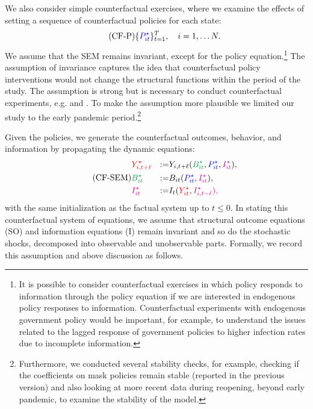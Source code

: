 \documentclass[3p, longtitle]{elsarticle}
\theoremstyle{definition}
\def\bcolor{\color{ForestGreen}}
\def\pcolor{\color{blue}}
\def\icolor{\color{magenta}}
\def\ycolor{\color{red}}
\begin{document}
We  also consider simple counterfactual exercises, where we examine the effects of setting
a sequence of counterfactual policies for each state:
\begin{equation} \label{p-cf}\tag{CF-P}
\{{\pcolor P^\star_{it}} \}_{t=1}^T, \quad i=1, \ldots N.
\end{equation}
We assume that the SEM remains invariant, except for the policy equation.\footnote{It is possible to consider counterfactual exercises in which policy  responds to information through the policy equation if we are interested in endogenous policy responses to information. Counterfactual experiments with endogenous government policy would be important, for example, to understand the issues related to the lagged response of government policies to higher infection rates due to incomplete information. }
The assumption  of invariance captures the idea that counterfactual policy interventions would not change the structural functions within the period of the study.  The assumption is strong but is necessary to conduct
counterfactual experiments, e.g. \cite{sims1972} and \cite{strotz1960recursive}. To make the assumption more plausible we limited our study to the early pandemic period.\footnote{Furthermore, we conducted several stability checks, for example, checking if the coefficients on mask policies remain stable (reported in the previous version) and also looking at more recent data during reopening, beyond early pandemic, to examine the stability of the model.}

Given the policies, we generate the counterfactual
outcomes, behavior, and information by propagating the dynamic equations:
\begin{equation} \label{eqn:CF-SEM} \tag{CF-SEM}
  \begin{aligned}
& {\ycolor Y^\star_{i,t+\ell}}  & := & Y_{i,t+\ell} ( {\bcolor B^\star_{it} } , {\pcolor P^\star_{it}}, {\icolor I^\star_{it}}), \\
& {\bcolor B^\star_{it} } & := &   B_{it}({\pcolor P^\star_{it} } ,{\icolor I^\star_{it}}), \\
& {\icolor I^\star_{it} }& := &  I_t ( {\ycolor Y^\star_{it}}, \icolor I^\star_{i,t-\ell}),  \end{aligned}
\end{equation}
with the same initialization as the factual system up to $t \leq 0$. In stating this counterfactual system of equations, we assume that structural outcome equations (SO) and information equations (I) remain invariant and so do the stochastic shocks, decomposed
into observable and unobservable parts. Formally, we record this assumption and above discussion as follows.
\end{document}
